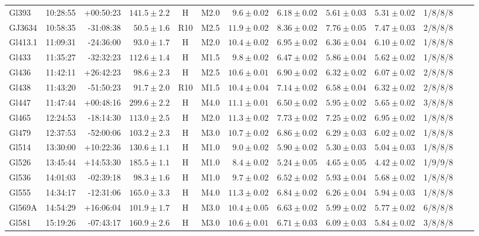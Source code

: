 \documentclass{aa}
\begin{document}
\begin{table}[h!]
{\begin{tabular}{ l r r r c c r r r r r r r}
Gl393 & 10:28:55 & +00:50:23 & $141.5 \pm  2.2$ & H & M2.0 & $ 9.6 \pm 0.02$ & $6.18 \pm 0.02$ & $5.61 \pm 0.03$ & $5.31 \pm 0.02$ & 1/8/8/8 \\
GJ3634 & 10:58:35 & -31:08:38 & $50.5 \pm  1.6$ & R10 & M2.5 & $11.9 \pm 0.02$ & $8.36 \pm 0.02$ & $7.76 \pm 0.05$ & $7.47 \pm 0.03$ & 2/8/8/8 \\
Gl413.1 & 11:09:31 & -24:36:00 & $93.0 \pm  1.7$ & H & M2.0 & $10.4 \pm 0.02$ & $6.95 \pm 0.02$ & $6.36 \pm 0.04$ & $6.10 \pm 0.02$ & 1/8/8/8 \\
Gl433 & 11:35:27 & -32:32:23 & $112.6 \pm  1.4$ & H & M1.5 & $ 9.8 \pm 0.02$ & $6.47 \pm 0.02$ & $5.86 \pm 0.04$ & $5.62 \pm 0.02$ & 1/8/8/8 \\
Gl436 & 11:42:11 & +26:42:23 & $98.6 \pm  2.3$ & H & M2.5 & $10.6 \pm 0.01$ & $6.90 \pm 0.02$ & $6.32 \pm 0.02$ & $6.07 \pm 0.02$ & 2/8/8/8 \\
Gl438 & 11:43:20 & -51:50:23 & $91.7 \pm  2.0$ & R10 & M1.5 & $10.4 \pm 0.04$ & $7.14 \pm 0.02$ & $6.58 \pm 0.04$ & $6.32 \pm 0.02$ & 2/8/8/8 \\
Gl447 & 11:47:44 & +00:48:16 & $299.6 \pm  2.2$ & H & M4.0 & $11.1 \pm 0.01$ & $6.50 \pm 0.02$ & $5.95 \pm 0.02$ & $5.65 \pm 0.02$ & 3/8/8/8 \\
Gl465 & 12:24:53 & -18:14:30 & $113.0 \pm  2.5$ & H & M2.0 & $11.3 \pm 0.02$ & $7.73 \pm 0.02$ & $7.25 \pm 0.02$ & $6.95 \pm 0.02$ & 1/8/8/8 \\
Gl479 & 12:37:53 & -52:00:06 & $103.2 \pm  2.3$ & H & M3.0 & $10.7 \pm 0.02$ & $6.86 \pm 0.02$ & $6.29 \pm 0.03$ & $6.02 \pm 0.02$ & 1/8/8/8 \\
Gl514 & 13:30:00 & +10:22:36 & $130.6 \pm  1.1$ & H & M1.0 & $ 9.0 \pm 0.02$ & $5.90 \pm 0.02$ & $5.30 \pm 0.03$ & $5.04 \pm 0.03$ & 1/8/8/8 \\
Gl526 & 13:45:44 & +14:53:30 & $185.5 \pm  1.1$ & H & M1.0 & $ 8.4 \pm 0.02$ & $5.24 \pm 0.05$ & $4.65 \pm 0.05$ & $4.42 \pm 0.02$ & 1/9/9/8 \\
Gl536 & 14:01:03 & -02:39:18 & $98.3 \pm  1.6$ & H & M1.0 & $ 9.7 \pm 0.02$ & $6.52 \pm 0.02$ & $5.93 \pm 0.04$ & $5.68 \pm 0.02$ & 1/8/8/8 \\
Gl555 & 14:34:17 & -12:31:06 & $165.0 \pm  3.3$ & H & M4.0 & $11.3 \pm 0.02$ & $6.84 \pm 0.02$ & $6.26 \pm 0.04$ & $5.94 \pm 0.03$ & 1/8/8/8 \\
Gl569A & 14:54:29 & +16:06:04 & $101.9 \pm  1.7$ & H & M3.0 & $10.4 \pm 0.05$ & $6.63 \pm 0.02$ & $5.99 \pm 0.02$ & $5.77 \pm 0.02$ & 6/8/8/8 \\
Gl581 & 15:19:26 & -07:43:17 & $160.9 \pm  2.6$ & H & M3.0 & $10.6 \pm 0.01$ & $6.71 \pm 0.03$ & $6.09 \pm 0.03$ & $5.84 \pm 0.02$ & 3/8/8/8 \\

\end{tabular}}
\end{table}
\end{document}
